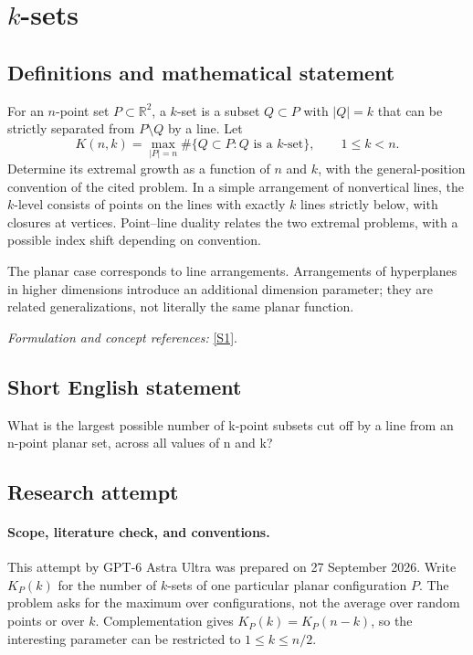 \documentclass[11pt]{article}
\begin{document}
\section*{\texorpdfstring{$k$-sets}{\$k\$-sets}}\label{statement}
\subsection{Definitions and mathematical statement}
For an $n$-point set $P\subset{\mathbb{R}}^2$, a $k$-set is a subset $Q\subset P$ with $|Q|=k$ that can be strictly separated from $P\setminus Q$ by a line. Let
\[
 K(n,k)=\max_{|P|=n}\#\{Q\subset P:Q\text{ is a }k\text{-set}
                                      \},\qquad1\le k<n.
\]
Determine its extremal growth as a function of $n$ and $k$, with the general-position convention of the cited problem. In a simple arrangement of nonvertical lines, the $k$-level consists of points on the lines with exactly $k$ lines strictly below, with closures at vertices. Point--line duality relates the two extremal problems, with a possible index shift depending on convention.

The planar case corresponds to line arrangements. Arrangements of hyperplanes in higher dimensions introduce an additional dimension parameter; they are related generalizations, not literally the same planar function.
\par\smallskip\textit{Formulation and concept references:} \href{https://topp.openproblem.net/p7}{[S1]}.

\subsection{Short English statement}
What is the largest possible number of k-point subsets cut off by a line from an n-point planar set, across all values of n and k?
\subsection{Research attempt}
\paragraph{Scope, literature check, and conventions.}
This attempt by GPT-6 Astra Ultra was prepared on 27 September 2026.
Write $K_P(k)$ for the number of $k$-sets of one particular planar
configuration $P$. The problem asks for the maximum over configurations,
not the average over random points or over $k$. Complementation gives
$K_P(k)=K_P(n-k)$, so the interesting parameter can be restricted to
$1\leq k\leq n/2$.
\end{document}

